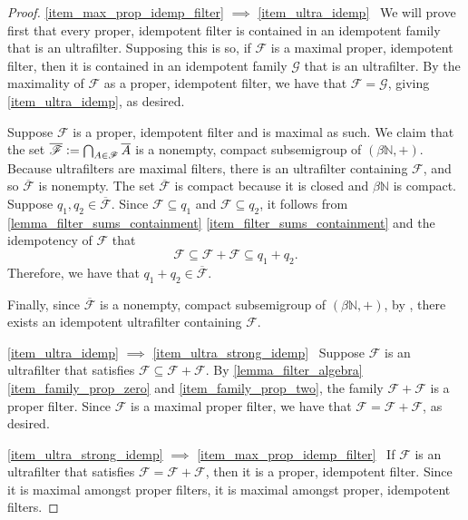 \documentclass[letter,11pt]{article}
\theoremstyle{plain}
\theoremstyle{definition}
\theoremstyle{plain}
\theoremstyle{plain}
\numberwithin{equation}{section}
\newcommand{\N}{\mathbb{N}}
\newcommand{\defeq}{\vcentcolon=}
\newcommand{\filter}{\mathscr{F}}
\newcommand{\family}{\mathscr{F}}
\newcommand{\familytwo}{\mathscr{G}}
\begin{document}
\begin{proof}
    \eqref{item_max_prop_idemp_filter} $\implies$ \eqref{item_ultra_idemp} \ We will prove first that every proper, idempotent filter is contained in an idempotent family that is an ultrafilter.  Supposing this is so, if $\family$ is a maximal proper, idempotent filter, then it is contained in an idempotent family $\familytwo$ that is an ultrafilter.  By the maximality of $\family$ as a proper, idempotent filter, we have that $\family = \familytwo$, giving \eqref{item_ultra_idemp}, as desired.

    Suppose $\family$ is a proper, idempotent filter and is maximal as such. We claim that the set $\overline{\filter} \defeq \bigcap_{A \in \family} \overline{A}$ is a nonempty, compact subsemigroup of $(\beta \N, +)$.  Because ultrafilters are maximal filters, there is an ultrafilter containing $\family$, and so $\overline{\filter}$ is nonempty.   The set $\overline{\filter}$ is compact because it is closed and $\beta \N$ is compact.  Suppose $q_1, q_2 \in \overline{\filter}$.  Since $\filter \subseteq q_1$ and $\filter \subseteq q_2$, it follows from \cref{lemma_filter_sums_containment} \eqref{item_filter_sums_containment} and the idempotency of $\filter$ that
    \[\filter \subseteq \filter + \filter \subseteq q_1 + q_2.\]
    Therefore, we have that $q_1 + q_2 \in \overline{\filter}$.

    Finally, since $\overline{\filter}$ is a nonempty, compact subsemigroup of $(\beta \N, +)$, by \cite[Thm. 2.5]{hindman_strauss_book_2012}, there exists an idempotent ultrafilter containing $\family$.

    \eqref{item_ultra_idemp} $\implies$ \eqref{item_ultra_strong_idemp} \ Suppose $\family$ is an ultrafilter that satisfies $\family \subseteq \family + \family$.  By \cref{lemma_filter_algebra} \eqref{item_family_prop_zero} and \eqref{item_family_prop_two}, the family $\family + \family$ is a proper filter.  Since $\family$ is a maximal proper filter, we have that $\family = \family + \family$, as desired.

    \eqref{item_ultra_strong_idemp} $\implies$ \eqref{item_max_prop_idemp_filter} \ If $\family$ is an ultrafilter that satisfies $\family = \family + \family$, then it is a proper, idempotent filter.  Since it is maximal amongst proper filters, it is maximal amongst proper, idempotent filters.
\end{proof}
\end{document}
